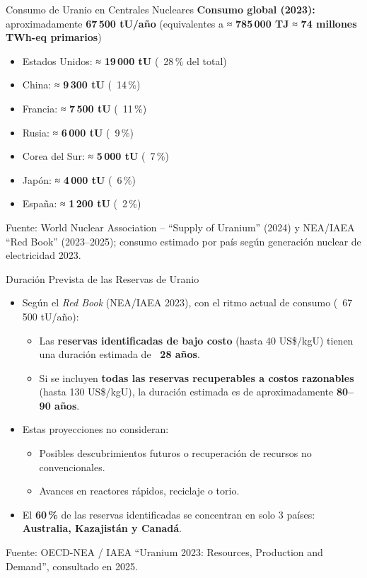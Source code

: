 \documentclass[main.tex]{subfiles}
\begin{document}
\begin{frame}{Consumo de Uranio en Centrales Nucleares}
    \textbf{Consumo global (2023):} aproximadamente \textbf{67\,500 tU/año}  
    (equivalentes a ≈ \textbf{785\,000 TJ} ≈ \textbf{74 millones TWh-eq primarios})  
    \vspace{0.5em}
    \begin{itemize}
        \item Estados Unidos: ≈ \textbf{19\,000 tU} (~28\,\% del total)
        \item China: ≈ \textbf{9\,300 tU} (~14\,\%)
        \item Francia: ≈ \textbf{7\,500 tU} (~11\,\%)
        \item Rusia: ≈ \textbf{6\,000 tU} (~9\,\%)
        \item Corea del Sur: ≈ \textbf{5\,000 tU} (~7\,\%)
        \item Japón: ≈ \textbf{4\,000 tU} (~6\,\%)
        \item España: ≈ \textbf{1\,200 tU} (~2\,\%)
    \end{itemize}
    \vspace{0.5em}
    \small{Fuente: World Nuclear Association – “Supply of Uranium” (2024) y NEA/IAEA “Red Book” (2023–2025); consumo estimado por país según generación nuclear de electricidad 2023.}
\end{frame}


\begin{frame}{Duración Prevista de las Reservas de Uranio}
    \begin{itemize}
        \item Según el \textit{Red Book} (NEA/IAEA 2023), con el ritmo actual de consumo (~67\,500 tU/año):
        \begin{itemize}
            \item Las \textbf{reservas identificadas de bajo costo} (hasta 40 US\$/kgU) tienen una duración estimada de \textbf{~28 años}.
            \item Si se incluyen \textbf{todas las reservas recuperables a costos razonables} (hasta 130 US\$/kgU), la duración estimada es de aproximadamente \textbf{80–90 años}.
        \end{itemize}
        \item Estas proyecciones no consideran:
        \begin{itemize}
            \item Posibles descubrimientos futuros o recuperación de recursos no convencionales.
            \item Avances en reactores rápidos, reciclaje o torio.
        \end{itemize}
        \item El \textbf{60\,\%} de las reservas identificadas se concentran en solo 3 países: \textbf{Australia, Kazajistán y Canadá}.
    \end{itemize}
    \vspace{0.5em}
    \small{Fuente: OECD-NEA / IAEA “Uranium 2023: Resources, Production and Demand”, consultado en 2025.}
\end{frame}
\end{document}
